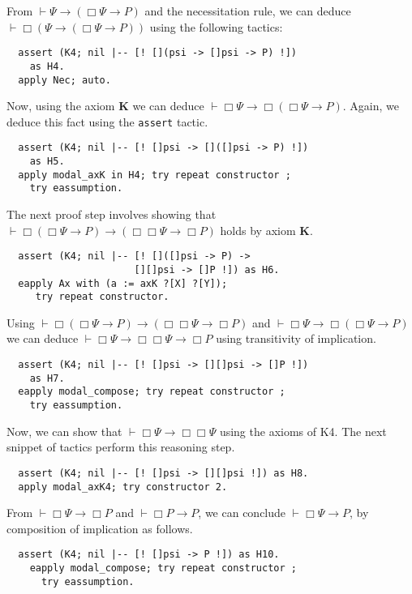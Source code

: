 \documentclass[sigconf]{acmart}
\begin{document}
From $\vdash \Psi \to (\Box \Psi \to P)$ and the necessitation
rule, we can deduce $\vdash \Box (\Psi \to (\Box \Psi \to P))$
using the following tactics:
\begin{verbatim}
  assert (K4; nil |-- [! [](psi -> []psi -> P) !])
    as H4.
  apply Nec; auto.
\end{verbatim}

\noindent Now, using the axiom \textbf{K} we can deduce $\vdash \Box \Psi \to
\Box (\Box \Psi \to P)$. Again, we deduce this fact using the
\texttt{assert} tactic.

\begin{verbatim}
  assert (K4; nil |-- [! []psi -> []([]psi -> P) !])
    as H5.
  apply modal_axK in H4; try repeat constructor ;
    try eassumption.
\end{verbatim}

\noindent The next proof step involves showing that
$\vdash \Box (\Box \Psi \to P)\to (\Box \Box \Psi \to \Box P)$ holds
by axiom \textbf{K}.

\begin{verbatim}
  assert (K4; nil |-- [! []([]psi -> P) ->
                      [][]psi -> []P !]) as H6.
  eapply Ax with (a := axK ?[X] ?[Y]);
     try repeat constructor.
\end{verbatim}

\noindent Using $\vdash \Box (\Box \Psi \to P)\to (\Box \Box \Psi \to \Box P)$ and
$\vdash \Box \Psi \to\Box (\Box \Psi \to P)$ we can deduce
$\vdash \Box \Psi \to \Box \Box \Psi \to \Box P$ using transitivity of
implication.

\begin{verbatim}
  assert (K4; nil |-- [! []psi -> [][]psi -> []P !])
    as H7.
  eapply modal_compose; try repeat constructor ;
    try eassumption.
\end{verbatim}

\noindent Now, we can show that $\vdash\Box\Psi\to\Box\Box\Psi$ using
the axioms of K4. The next snippet of tactics perform this
reasoning step.

\begin{verbatim}
  assert (K4; nil |-- [! []psi -> [][]psi !]) as H8.
  apply modal_axK4; try constructor 2.
\end{verbatim}

\noindent From $\vdash \Box\Psi \to \Box P$ and $\vdash \Box P \to P$, we can
conclude $\vdash \Box \Psi \to P$, by composition of implication as
follows.

\begin{verbatim}
  assert (K4; nil |-- [! []psi -> P !]) as H10.
    eapply modal_compose; try repeat constructor ;
      try eassumption.
\end{verbatim}
\end{document}
